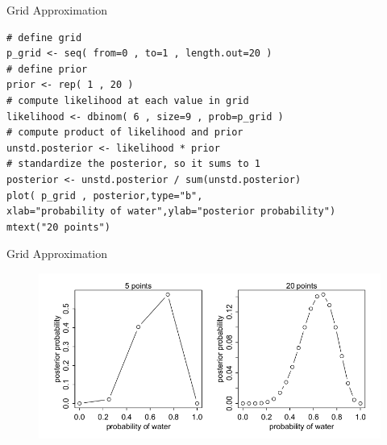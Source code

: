 \documentclass[handout]{beamer}
\begin{document}
\begin{frame}[fragile]{Grid Approximation}
\begin{scriptsize}
 \begin{verbatim}
# define grid
p_grid <- seq( from=0 , to=1 , length.out=20 )
# define prior
prior <- rep( 1 , 20 )
# compute likelihood at each value in grid
likelihood <- dbinom( 6 , size=9 , prob=p_grid )
# compute product of likelihood and prior
unstd.posterior <- likelihood * prior
# standardize the posterior, so it sums to 1
posterior <- unstd.posterior / sum(unstd.posterior)
plot( p_grid , posterior,type="b",
xlab="probability of water",ylab="posterior probability")
mtext("20 points")
\end{verbatim}
\end{scriptsize}


\end{frame}


\begin{frame}{Grid Approximation}

\begin{figure}[h!]
	\centering
	\includegraphics[scale=0.4]{pics/grid.png}
\end{figure}


\end{frame}
\end{document}
